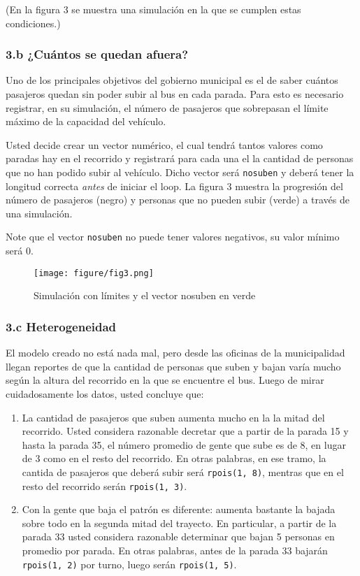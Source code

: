 \documentclass[]{article}
\makeatletter
\def\maxwidth{\ifdim\Gin@nat@width>\linewidth\linewidth
\else\Gin@nat@width\fi}
\let\Oldincludegraphics\includegraphics
\renewcommand{\includegraphics}[1]{\Oldincludegraphics[width=\maxwidth]{#1}}
\makeatother
\begin{document}
(En la figura 3 se muestra una simulación en la que se cumplen estas
condiciones.)

\subsubsection{3.b ¿Cuántos se quedan afuera?}

Uno de los principales objetivos del gobierno municipal es el de saber
cuántos pasajeros quedan sin poder subir al bus en cada parada. Para
esto es necesario registrar, en su simulación, el número de pasajeros
que sobrepasan el límite máximo de la capacidad del vehículo.

Usted decide crear un vector numérico, el cual tendrá tantos valores
como paradas hay en el recorrido y registrará para cada una el la
cantidad de personas que no han podido subir al vehículo. Dicho vector
será \texttt{nosuben} y deberá tener la longitud correcta \emph{antes}
de iniciar el loop. La figura 3 muestra la progresión del número de
pasajeros (negro) y personas que no pueden subir (verde) a través de una
simulación.

Note que el vector \texttt{nosuben} no puede tener valores negativos, su
valor mínimo será 0.

\begin{figure}[htbp]
\centering
\texttt{[image: figure/fig3.png]}
\caption{Simulación con límites y el vector nosuben en verde}
\end{figure}

\subsubsection{3.c Heterogeneidad}

El modelo creado no está nada mal, pero desde las oficinas de la
municipalidad llegan reportes de que la cantidad de personas que suben y
bajan varía mucho según la altura del recorrido en la que se encuentre
el bus. Luego de mirar cuidadosamente los datos, usted concluye que:

\begin{enumerate}[1.]
\item
  La cantidad de pasajeros que suben aumenta mucho en la la mitad del
  recorrido. Usted considera razonable decretar que a partir de la
  parada 15 y hasta la parada 35, el número promedio de gente que sube
  es de 8, en lugar de 3 como en el resto del recorrido. En otras
  palabras, en ese tramo, la cantida de pasajeros que deberá subir será
  \texttt{rpois(1, 8)}, mentras que en el resto del recorrido serán
  \texttt{rpois(1, 3)}.
\item
  Con la gente que baja el patrón es diferente: aumenta bastante la
  bajada sobre todo en la segunda mitad del trayecto. En particular, a
  partir de la parada 33 usted considera razonable determinar que bajan
  5 personas en promedio por parada. En otras palabras, antes de la
  parada 33 bajarán \texttt{rpois(1, 2)} por turno, luego serán
  \texttt{rpois(1, 5)}.
\end{enumerate}
\end{document}
